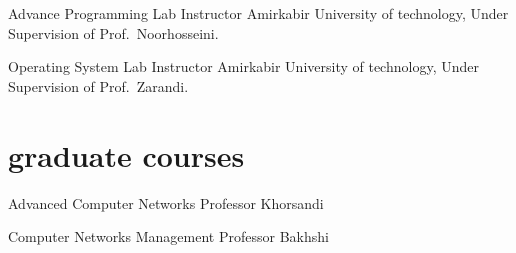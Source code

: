 \documentclass[]{friggeri-cv} %
\begin{document}
\begin{entrylist}


  {Advance Programming Lab}
  {Instructor}
  {Amirkabir University of technology, Under Supervision of Prof.\ Noorhosseini.}


  {Operating System Lab}
  {Instructor}
  {Amirkabir University of technology, Under Supervision of Prof.\ Zarandi.}


\end{entrylist}


\section{graduate courses}

\begin{entrylist}

  {Advanced Computer Networks}
  {Professor Khorsandi}
  {}


  {Computer Networks Management}
  {Professor Bakhshi}
  {}



\end{entrylist}

\end{document}
